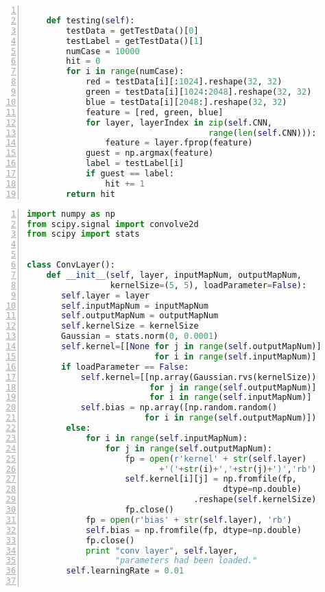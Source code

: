 \begin{lstlisting}[language=Python,numbers=left, frame=shadowbox, rulesepcolor=\color{cadegrey}, caption=\text{CNNs.py}]
    
    def testing(self):
        testData = getTestData()[0]
        testLabel = getTestData()[1]
        numCase = 10000
        hit = 0
        for i in range(numCase):
            red = testData[i][:1024].reshape(32, 32)
            green = testData[i][1024:2048].reshape(32, 32)
            blue = testData[i][2048:].reshape(32, 32)
            feature = [red, green, blue]
            for layer, layerIndex in zip(self.CNN, 
                                     range(len(self.CNN))):
                feature = layer.fprop(feature)
            guest = np.argmax(feature)
            label = testLabel[i]
            if guest == label:
                hit += 1
        return hit
\end{lstlisting}

\newpage

\begin{lstlisting}[language=Python,numbers=left, frame=shadowbox, rulesepcolor=\color{cadegrey}, caption=\text{ConvLayer.py}]
import numpy as np
from scipy.signal import convolve2d
from scipy import stats


class ConvLayer():
    def __init__(self, layer, inputMapNum, outputMapNum, 
                 kernelSize=(5, 5), loadParameter=False):
       self.layer = layer
       self.inputMapNum = inputMapNum
       self.outputMapNum = outputMapNum
       self.kernelSize = kernelSize
       Gaussian = stats.norm(0, 0.0001)
       self.kernel=[[None for j in range(self.outputMapNum)]
                          for i in range(self.inputMapNum)]
       if loadParameter == False:
           self.kernel=[[np.array(Gaussian.rvs(kernelSize))
                         for j in range(self.outputMapNum)]
                         for i in range(self.inputMapNum)]
           self.bias = np.array([np.random.random() 
                        for i in range(self.outputMapNum)])
        else:
            for i in range(self.inputMapNum):
                for j in range(self.outputMapNum):
                    fp = open(r'kernel' + str(self.layer) 
                           +'('+str(i)+','+str(j)+')','rb')
                    self.kernel[i][j] = np.fromfile(fp, 
                                        dtype=np.double)
                                  .reshape(self.kernelSize)
                    fp.close()
            fp = open(r'bias' + str(self.layer), 'rb')
            self.bias = np.fromfile(fp, dtype=np.double)
            fp.close()
            print "conv layer", self.layer, 
                  "parameters had been loaded."
        self.learningRate = 0.01


\end{lstlisting}
